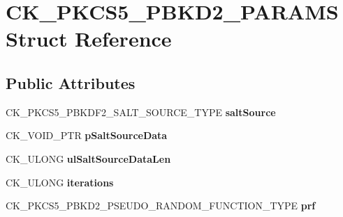 \hypertarget{struct_c_k___p_k_c_s5___p_b_k_d2___p_a_r_a_m_s}{}\section{C\+K\+\_\+\+P\+K\+C\+S5\+\_\+\+P\+B\+K\+D2\+\_\+\+P\+A\+R\+A\+MS Struct Reference}
\label{struct_c_k___p_k_c_s5___p_b_k_d2___p_a_r_a_m_s}
\subsection*{Public Attributes}
\begin{DoxyCompactItemize}
\item 
\mbox{\label{struct_c_k___p_k_c_s5___p_b_k_d2___p_a_r_a_m_s_ad76815cc8a8629dda668e8073708b692}} 
C\+K\+\_\+\+P\+K\+C\+S5\+\_\+\+P\+B\+K\+D\+F2\+\_\+\+S\+A\+L\+T\+\_\+\+S\+O\+U\+R\+C\+E\+\_\+\+T\+Y\+PE {\bfseries salt\+Source}
\item 
\mbox{\label{struct_c_k___p_k_c_s5___p_b_k_d2___p_a_r_a_m_s_abbfdc94b0dcb4495e761e5fb924e7ee5}} 
C\+K\+\_\+\+V\+O\+I\+D\+\_\+\+P\+TR {\bfseries p\+Salt\+Source\+Data}
\item 
\mbox{\label{struct_c_k___p_k_c_s5___p_b_k_d2___p_a_r_a_m_s_a279cb440e92dea8685aee3533dae51ab}} 
C\+K\+\_\+\+U\+L\+O\+NG {\bfseries ul\+Salt\+Source\+Data\+Len}
\item 
\mbox{\label{struct_c_k___p_k_c_s5___p_b_k_d2___p_a_r_a_m_s_a76af9633891211b81563616e79a54d70}} 
C\+K\+\_\+\+U\+L\+O\+NG {\bfseries iterations}
\item 
\mbox{\label{struct_c_k___p_k_c_s5___p_b_k_d2___p_a_r_a_m_s_a1ac904b48a043a9780cb5764bbde2917}} 
C\+K\+\_\+\+P\+K\+C\+S5\+\_\+\+P\+B\+K\+D2\+\_\+\+P\+S\+E\+U\+D\+O\+\_\+\+R\+A\+N\+D\+O\+M\+\_\+\+F\+U\+N\+C\+T\+I\+O\+N\+\_\+\+T\+Y\+PE {\bfseries prf}
\item 
\mbox{\label{struct_c_k___p_k_c_s5___p_b_k_d2___p_a_r_a_m_s_a6920d5b2e9b625d38df19301f6bad37f}} 

\end{DoxyCompactItemize}
